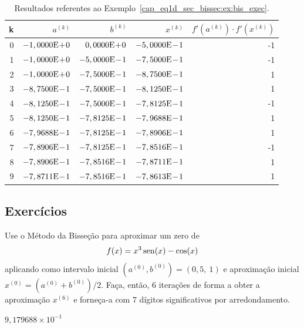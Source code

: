 \begin{ex}
\begin{table}[H]
  \centering
  \caption{Resultados referentes ao Exemplo~\ref{cap_eq1d_sec_bissec:ex:bis_exec}.}
  \begin{tabular}{r|rr|r|r}
    k & $a^{(k)}$ & $b^{(k)}$ & $x^{(k)}$ & $f'(a^{(k)})\cdot f'(x^{(k)})$\\\hline
    0 & $-1,0000\mathrm{E}\!+\!0$ & $0,0000\mathrm{E}\!+\!0$ & $-5,0000\mathrm{E}\!-\!1$ & -1 \\
    1 & $-1,0000\mathrm{E}\!+\!0$ & $-5,0000\mathrm{E}\!-\!1$ & $-7,5000\mathrm{E}\!-\!1$ & -1 \\
    2 & $-1,0000\mathrm{E}\!+\!0$ & $-7,5000\mathrm{E}\!-\!1$ & $-8,7500\mathrm{E}\!-\!1$ & 1 \\
    3 & $-8,7500\mathrm{E}\!-\!1$ & $-7,5000\mathrm{E}\!-\!1$ & $-8,1250\mathrm{E}\!-\!1$ &  1 \\
    4 & $-8,1250\mathrm{E}\!-\!1$ & $-7,5000\mathrm{E}\!-\!1$ & $-7,8125\mathrm{E}\!-\!1$ & -1 \\
    5 & $-8,1250\mathrm{E}\!-\!1$ & $-7,8125\mathrm{E}\!-\!1$ & $-7,9688\mathrm{E}\!-\!1$ & 1 \\
    6 & $-7,9688\mathrm{E}\!-\!1$ & $-7,8125\mathrm{E}\!-\!1$ & $-7,8906\mathrm{E}\!-\!1$ & 1 \\
    7 & $-7,8906\mathrm{E}\!-\!1$ & $-7,8125\mathrm{E}\!-\!1$ & $-7,8516\mathrm{E}\!-\!1$ & -1 \\
    8 & $-7,8906\mathrm{E}\!-\!1$ & $-7,8516\mathrm{E}\!-\!1$ & $-7,8711\mathrm{E}\!-\!1$ & 1 \\
    9 & $-7,8711\mathrm{E}\!-\!1$ & $-7,8516\mathrm{E}\!-\!1$ & $-7,8613\mathrm{E}\!-\!1$ & 1 \\\hline
  \end{tabular}
  \label{cap_eq1d_sec_bissec:tab:bis_multpar}
\end{table}
\end{ex}

\subsection{Exercícios}

\begin{exer}
  Use o Método da Bisseção para aproximar um zero de
  \begin{equation}
    f(x)=x^3\operatorname{sen}(x)-\cos(x)
\end{equation}
aplicando como intervalo inicial $(a^{(0)}, b^{(0)}) = (0,5, ~1)$ e aproximação inicial $x^{(0)}=(a^{(0)}+b^{(0)})/2$. Faça, então, $6$ iterações de forma a obter a aproximação $x^{(6)}$ e forneça-a com $7$ dígitos significativos por arredondamento.
\end{exer}
\begin{resp}
  $9,179688\times 10^{-1}$
\end{resp}

